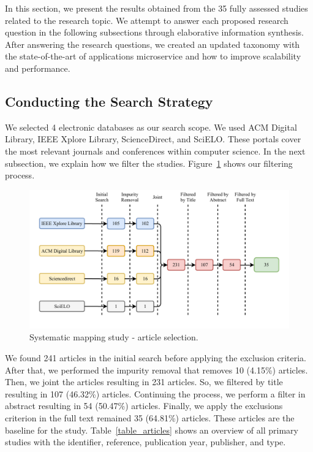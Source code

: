 

In this section, we present the results obtained from the 35 fully assessed studies related to the research topic. We attempt to answer each proposed research question in the following subsections through elaborative information synthesis. After answering the research questions, we created an updated taxonomy with the state-of-the-art of applications microservice and how to improve scalability and performance. 

\subsection{Conducting the Search Strategy}
We selected 4 electronic databases as our search scope. We used ACM Digital Library, IEEE Xplore Library, ScienceDirect, and SciELO. These portals cover the most relevant journals and conferences within computer science. In the next subsection, we explain how we filter the studies. Figure~\ref{article_selection} shows our filtering process. 

\begin{figure}[htb]
\centering
\includegraphics[scale=0.7]{Images/Article_selection.pdf}
\caption{Systematic mapping study - article selection.}
\label{article_selection}
\end{figure}

We found 241 articles in the initial search before applying the exclusion criteria. After that, we performed the impurity removal that removes 10 (4.15\%) articles. Then, we joint the articles resulting in 231 articles. So, we filtered by title resulting in 107 (46.32\%) articles. Continuing the process, we perform a filter in abstract resulting in 54 (50.47\%) articles. Finally, we apply the exclusions criterion in the full text remained 35 (64.81\%) articles. These articles are the baseline for the study. Table~\ref{table_articles} shows an overview of all primary studies with the identifier, reference, publication year, publisher, and type.

